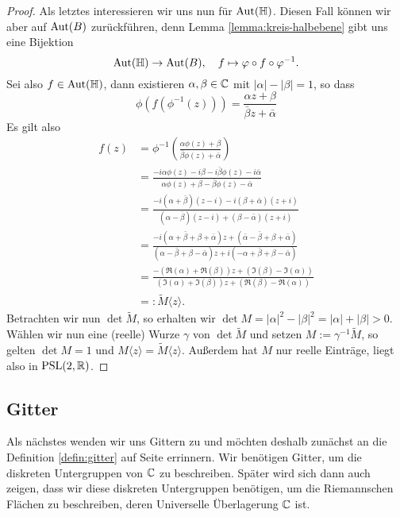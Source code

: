 \begin{proof}
  Als letztes interessieren wir uns nun für $\operatorname{Aut}(\mathbb{H})$. Diesen Fall
  können wir aber auf $\operatorname{Aut}(B)$ zurückführen, denn Lemma
  \ref{lemma:kreis-halbebene} gibt uns eine Bijektion
  \[
  \operatorname{Aut}(\mathbb{H}) \rightarrow \operatorname{Aut}(B), \quad f \mapsto \varphi \circ f \circ \varphi^{-1}.
  \]
  Sei also $f \in \operatorname{Aut}(\mathbb{H})$, dann existieren $\alpha, \beta \in \mathbb{C}$
  mit $|\alpha| - |\beta| = 1$, so dass
  \[
  \phi( f( \phi^{-1}(z))) = \frac{\alpha z + \beta}{\bar \beta z +
    \bar \alpha}
  \]
  Es gilt also
  \begin{align*}
    f(z) & = \phi^{-1} \left ( \frac{\alpha \phi(z) + \beta}{\bar
        \beta \phi(z) + \bar \alpha} \right ) \\
    & = \frac{-i \alpha \phi(z) - i \beta - i \bar \beta \phi(z) - i
      \bar \alpha}{\alpha \phi(z) + \beta - \bar \beta \phi(z) - \bar
      \alpha} \\
    & = \frac{-i (\alpha + \bar \beta)(z-i) -i (\beta + \bar
      \alpha)(z+i)}{(\alpha - \bar \beta)(z -i) + (\beta - \bar
      \alpha)(z+i)} \\
    & = \frac{-i ( \alpha + \bar \beta + \beta + \bar \alpha) z + (
      \bar \alpha - \bar \beta + \beta + \bar \alpha)}{(\alpha - \bar
      \beta + \beta - \bar \alpha)z + i (- \alpha + \bar \beta + \beta
      - \bar \alpha)} \\
    & = \frac{ - ( \Re(\alpha) + \Re(\beta)) z +  (\Im(\beta) -
      \Im(\alpha))}{(\Im(\alpha) + \Im(\beta))z + ( \Re(\beta) -
      \Re(\alpha))} \\
    & =: \tilde M\langle z \rangle.
  \end{align*}
  Betrachten wir nun $\det \tilde M$, so erhalten wir $\det M = |\alpha|^2 -
  |\beta|^2 = |\alpha| + |\beta| > 0$. Wählen wir nun eine (reelle)
  Wurze $\gamma$ von $\det \tilde M$ und setzen $M := \gamma^{-1}
  \tilde M$, so gelten $\det M = 1$ und $M \langle z \rangle = \tilde M
  \langle z \rangle$. Außerdem hat $M$ nur reelle Einträge, liegt also
  in $\operatorname{PSL}(2, \mathbb{R})$.
\end{proof}

\subsection{Gitter}
\label{sec:gitter}

Als nächstes wenden wir uns Gittern zu und möchten deshalb zunächst an
die Definition \ref{defin:gitter} auf Seite \pageref{defin:gitter}
errinnern. Wir benötigen Gitter, um die
diskreten Untergruppen von $\mathbb{C}$ zu beschreiben. Später wird sich dann
auch zeigen, dass wir diese diskreten Untergruppen benötigen, um die
Riemannschen Flächen zu beschreiben, deren Universelle Überlagerung
$\mathbb{C}$ ist.


